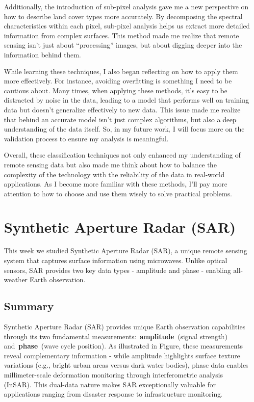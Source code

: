 \documentclass[
  letterpaper,
  DIV=11,
  numbers=noendperiod]{scrreprt}
\begin{document}
Additionally, the introduction of sub-pixel analysis gave me a new
perspective on how to describe land cover types more accurately. By
decomposing the spectral characteristics within each pixel, sub-pixel
analysis helps us extract more detailed information from complex
surfaces. This method made me realize that remote sensing isn't just
about ``processing'' images, but about digging deeper into the
information behind them.

While learning these techniques, I also began reflecting on how to apply
them more effectively. For instance, avoiding overfitting is something I
need to be cautious about. Many times, when applying these methods, it's
easy to be distracted by noise in the data, leading to a model that
performs well on training data but doesn't generalize effectively to new
data. This issue made me realize that behind an accurate model isn't
just complex algorithms, but also a deep understanding of the data
itself. So, in my future work, I will focus more on the validation
process to ensure my analysis is meaningful.

Overall, these classification techniques not only enhanced my
understanding of remote sensing data but also made me think about how to
balance the complexity of the technology with the reliability of the
data in real-world applications. As I become more familiar with these
methods, I'll pay more attention to how to choose and use them wisely to
solve practical problems.


\chapter{Synthetic Aperture Radar
(SAR)}\label{synthetic-aperture-radar-sar}

This week we studied Synthetic Aperture Radar (SAR), a unique remote
sensing system that captures surface information using microwaves.
Unlike optical sensors, SAR provides two key data types - amplitude and
phase - enabling all-weather Earth observation.~

\section{Summary}\label{summary-6}

Synthetic Aperture Radar (SAR) provides unique Earth observation
capabilities through its two fundamental
measurements:~\textbf{amplitude}~(signal strength)
and~\textbf{phase}~(wave cycle position). As illustrated in Figure,
these measurements reveal complementary information - while amplitude
highlights surface texture variations (e.g., bright urban areas versus
dark water bodies), phase data enables millimeter-scale deformation
monitoring through interferometric analysis (InSAR). This dual-data
nature makes SAR exceptionally valuable for applications ranging from
disaster response to infrastructure monitoring.
\end{document}
